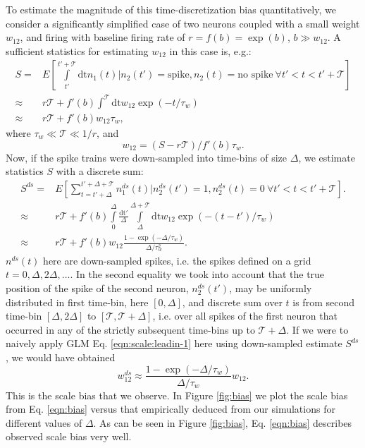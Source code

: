 To estimate the magnitude of this time-discretization bias quantitatively, we consider a significantly simplified case of two neurons coupled with a small weight $w_{12}$, and firing with baseline firing rate of $r=f(b)=\exp(b)$, $b \gg w_{12}$.
A sufficient statistics for estimating $w_{12}$ in this case is, e.g.:
\begin{equation}\label{eqn:scale:leadin-1}
\begin{array}{rl}
S =& E\left[\int\limits_{t'}^{t'+\mathcal{T}} \text{dt} n_1(t) | n_2(t')=\text{spike}, n_2(t)=\text{no spike}\ \forall t'<t<t'+\mathcal{T}\right] \\
\approx & r \mathcal{T} + f'(b) \int^{\mathcal{T}}  \text{dt} w_{12} \exp(-t/\tau_w) \\
\approx & r \mathcal{T} + f'(b) w_{12}\tau_w,
\end{array}
\end{equation}
where $\tau_w \ll \mathcal{T} \ll 1/r$, and
\begin{equation}\label{eqn:scale:leadin-1}
w_{12}=(S-r\mathcal{T})/f'(b)\tau_w.
\end{equation}
Now, if the spike trains were down-sampled into time-bins of size $\Delta$,
we estimate statistics $S$ with a discrete sum:
\begin{equation}\label{eqn:scale:leadin-2}
\begin{array}{rl}
S^{ds}=&E\left[\sum\limits_{t=t'+\Delta}^{t'+\Delta + \mathcal{T}} n^{ds}_1(t) | n^{ds}_2(t')=1, n^{ds}_2(t)=0\ \forall
t'<t<t'+\mathcal{T}\right]. \\
\approx& r \mathcal{T} + f'(b) \int\limits_0^\Delta \frac{\text{dt}'}{\Delta} \int\limits_{\Delta}^{\Delta + \mathcal{T}} \text{dt} w_{12}\exp(-(t-t')/\tau_w) \\
\approx & r \mathcal{T} +  f'(b)w_{12}\frac{1-\exp(-\Delta/\tau_w)}{\Delta/\tau_w^2}.
\end{array}
\end{equation}
$n^{ds}(t)$ here are down-sampled spikes, i.e. the spikes defined on a grid $t=0,\Delta,2\Delta,\ldots$.
In the second equality we took into account that the true position of the spike of the second neuron, $n^{ds}_2(t')$, may be uniformly distributed in first time-bin, here $[0,\Delta]$, and discrete sum over $t$ is from second time-bin $[\Delta,2\Delta]$ to $[\mathcal{T},\mathcal{T}+\Delta]$, i.e. over all spikes of the first neuron that occurred in any of the strictly subsequent time-bins up to $\mathcal{T} + \Delta$.
If we were to naively apply GLM Eq. \ref{eqn:scale:leadin-1} here using down-sampled estimate $S^{ds}$, we would have obtained
\begin{equation}\label{eqn:bias}
w_{12}^{ds}\approx \frac{1-\exp(-\Delta/\tau_w)}{\Delta/\tau_w} w_{12}.
\end{equation}
This is the scale bias that we observe.
In Figure \ref{fig:bias} we plot the scale bias from Eq. \ref{eqn:bias} versus that empirically deduced from our simulations for different values of $\Delta$. As can be seen in Figure \ref{fig:bias}, Eq. \ref{eqn:bias} describes observed scale bias very well.

